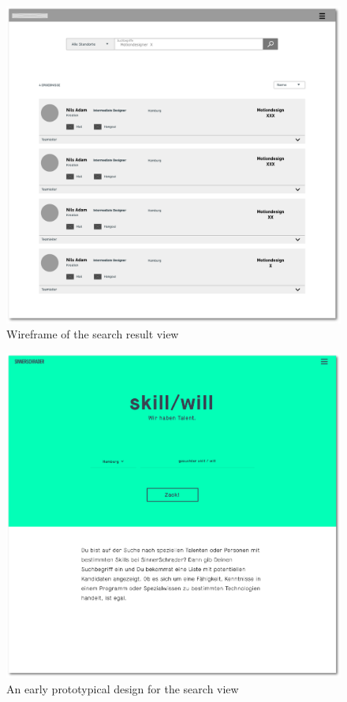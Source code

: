 \begin{figure}[p]
    \centering
    \includegraphics[width=\textwidth]{images/wireframe.png}
    \caption[Illustration: Search Result Page (Wireframe)]{Wireframe of the search result view}
    \label{fig:wireframe}
\end{figure}

\begin{figure}[p]
    \centering
    \includegraphics[width=\textwidth]{images/design_home.png}
    \caption[Illustration: Search Page (Concept)]{An early prototypical design for the search view}
    \label{fig:design_home}
\end{figure}


